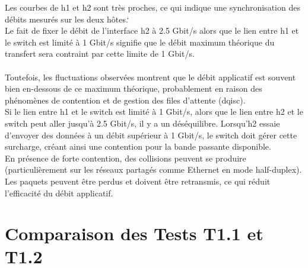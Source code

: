 Les courbes de h1 et h2 sont très proches, ce qui indique une synchronisation des débits mesurés sur les deux hôtes.`\\
Le fait de fixer le débit de l'interface h2 à 2.5 Gbit/s alors que le lien entre h1 et le switch est limité à 1 Gbit/s signifie que le débit maximum théorique du transfert sera contraint par cette limite de 1 Gbit/s.
\\
\\Toutefois, les fluctuations observées montrent que le débit applicatif est souvent bien en-dessous de ce maximum théorique, probablement en raison des phénomènes de contention et de gestion des files d'attente (dqisc).
\vspace{0.5cm}
\\
Si le lien entre h1 et le switch est limité à 1 Gbit/s, alors que le lien entre h2 et le switch peut aller jusqu'à 2.5 Gbit/s, il y a un déséquilibre.
Lorsqu'h2 essaie d'envoyer des données à un débit supérieur à 1 Gbit/s, le switch doit gérer cette surcharge, créant ainsi une contention pour la bande passante disponible.
\\
En présence de forte contention, des collisions peuvent se produire (particulièrement sur les réseaux partagés comme Ethernet en mode half-duplex).
Les paquets peuvent être perdus et doivent être retransmis, ce qui réduit l'efficacité du débit applicatif.



\newpage
\section{Comparaison des Tests T1.1 et T1.2}


